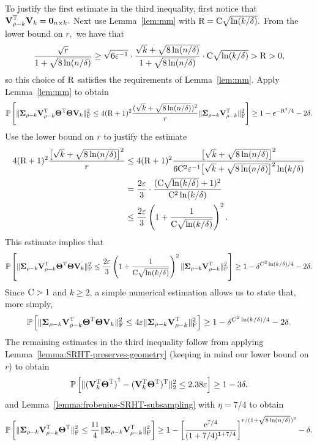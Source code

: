 To justify the first estimate in the third inequality, first notice that ${\bm{\mathrm{V}}}^{\textsc{T}}_{\rho - k} {\bm{\mathrm{V}}}_k = {\bf 0}_{n \times k}.$ Next use Lemma~\ref{lem:mm} with $\mathrm{R} = \mathrm{C} \sqrt{\ln(k/\delta)}.$ From the lower bound on $r,$ we have that
\[
{\sqrt{r}\over 1 + \sqrt{8\ln(n/\delta)}} \geq \sqrt{6\varepsilon^{-1}} \cdot {\sqrt{k} + \sqrt{8 \ln(n/\delta)}\over 1 + \sqrt{8 \ln(n/\delta)}} \cdot \mathrm{C} \sqrt{\ln(k/\delta)} > \mathrm{R} > 0,
\]
so this choice of $\mathrm{R}$ satisfies the requirements of Lemma~\ref{lem:mm}. Apply Lemma~\ref{lem:mm} to obtain
\[
\mbox{}{\mathbb{P}}\left[ \mbox{}\|{\bm{\mathrm{\Sigma}}}_{\rho-k} {\bm{\mathrm{V}}}_{\rho-k}^{\textsc{T}} {\bm{\mathrm{\Theta}}}^{\textsc{T}} {\bm{\mathrm{\Theta}}} {\bm{\mathrm{V}}}_k\|_\mathrm{F}^2 \le 4 (\mathrm{R} + 1)^2 {(\sqrt{k} + \sqrt{8 \ln(n/\delta)})^2\over r} \mbox{}\|{\bm{\mathrm{\Sigma}}}_{\rho-k} {\bm{\mathrm{V}}}_{\rho-k}^{\textsc{T}}   \|_\mathrm{F}^2 \right] \geq 1-e^{-\mathrm{R}^2/4}-2\delta.
\]
Use the lower bound on $r$ to justify the estimate
\begin{align*}
4 (\mathrm{R} + 1)^2 {\big[\sqrt{k} + \sqrt{8 \ln(n/\delta)} \big]^2\over r} & \leq 4 (\mathrm{R} + 1)^2 {\big[\sqrt{k} + \sqrt{8 \ln(n/\delta)}\big]^2\over 6\mathrm{C}^2 \varepsilon^{-1} \big[\sqrt{k} + \sqrt{8 \ln(n/\delta)}\big]^2 \ln(k/\delta)} \\
 & = {2 \varepsilon\over 3} \cdot {( \ensuremath{\mathrm{C}} \sqrt{\ln(k/\delta)} + 1)^2\over \ensuremath{\mathrm{C}}^2 \ln(k/\delta)} \\
 & \leq {2 \varepsilon\over 3} \left( 1 + {1\over \mathrm{C} \sqrt{\ln(k/\delta)}} \right)^2.
\end{align*}
This estimate implies that
\[
 \mbox{}{\mathbb{P}}\left[ \mbox{}\|{\bm{\mathrm{\Sigma}}}_{\rho-k} {\bm{\mathrm{V}}}_{\rho-k}^{\textsc{T}} {\bm{\mathrm{\Theta}}}^{\textsc{T}} {\bm{\mathrm{\Theta}}} {\bm{\mathrm{V}}}_k\|_\mathrm{F}^2 \le {2 \varepsilon\over 3} \left(1 + {1\over \mathrm{C}\sqrt{\ln(k/\delta)}}\right)^2 \mbox{}\|{\bm{\mathrm{\Sigma}}}_{\rho-k} {\bm{\mathrm{V}}}_{\rho-k}^{\textsc{T}}   \|_\mathrm{F}^2 \right] \geq 1 - \delta^{C^2 \ln(k/\delta) /4} - 2\delta.
\]
Since $\mathrm{C} > 1$ and $k \geq 2$, a simple numerical estimation allows us to state that, more simply,
\[
 \mbox{}{\mathbb{P}}\left[ \mbox{}\|{\bm{\mathrm{\Sigma}}}_{\rho-k} {\bm{\mathrm{V}}}_{\rho-k}^{\textsc{T}} {\bm{\mathrm{\Theta}}}^{\textsc{T}} {\bm{\mathrm{\Theta}}} {\bm{\mathrm{V}}}_k\|_\mathrm{F}^2 \le 4 \varepsilon \mbox{}\|{\bm{\mathrm{\Sigma}}}_{\rho-k} {\bm{\mathrm{V}}}_{\rho-k}^{\textsc{T}} \|_\mathrm{F}^2 \right] \geq 1 - \delta^{C^2 \ln(k/\delta)/4} - 2\delta.
\]
The remaining estimates in the third inequality follow from applying Lemma~\ref{lemma:SRHT-preserves-geometry} (keeping in mind our lower bound on $r$) to obtain
\[
\mbox{}{\mathbb{P}}\left[\mbox{}\|{({\bm{\mathrm{V}}}_k^{\textsc{T}} {\bm{\mathrm{\Theta}}}^{\textsc{T}})}^\dagger - ({\bm{\mathrm{V}}}_k^{\textsc{T}} {\bm{\mathrm{\Theta}}}^{\textsc{T}})^{\textsc{T}}\|_2^2 \le 2.38 \varepsilon\right] \geq 1 - 3\delta.
\]
and Lemma~\ref{lemma:frobenius-SRHT-subsampling} with $\eta=7/4$ to obtain
\[
 \mbox{}{\mathbb{P}}\left[\mbox{}\|{\bm{\mathrm{\Sigma}}}_{\rho-k} {\bm{\mathrm{V}}}_{\rho-k}^{\textsc{T}}   {\bm{\mathrm{\Theta}}}^{\textsc{T}}\|_\mathrm{F}^2 \le  {11\over 4} \mbox{}\|{\bm{\mathrm{\Sigma}}}_{\rho-k} {\bm{\mathrm{V}}}_{\rho-k}^{\textsc{T}}  \|_\mathrm{F}^2\right] \geq 1 - \left[ {{\mathrm e}^{7/4}\over  (1 + 7/4)^{1 + 7/4} } \right]^{r/(1 + \sqrt{8 \ln(n/\delta)})^2} - \delta.
 \]
